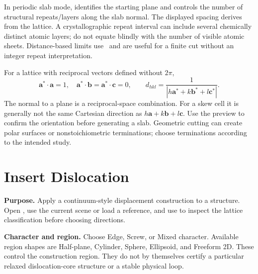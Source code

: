 In periodic slab mode,  identifies the starting plane and  controls the number of structural repeats/layers along the slab normal. The displayed spacing derives from the lattice. A crystallographic repeat interval can include several chemically distinct atomic layers; do not equate  blindly with the number of visible atomic sheets. Distance-based limits use \angstrom\ and are useful for a finite cut without an integer repeat interpretation.

For a lattice with reciprocal vectors defined without $2\pi$,
\[
\mathbf a^*\cdot\mathbf a=1,\quad
\mathbf a^*\cdot\mathbf b=\mathbf a^*\cdot\mathbf c=0,
\qquad d_{hkl}=\frac{1}{|h\mathbf a^*+k\mathbf b^*+l\mathbf c^*|}.
\]
The normal to a plane is a reciprocal-space combination. For a skew cell it is generally not the same Cartesian direction as $h\mathbf a+k\mathbf b+l\mathbf c$. Use the preview to confirm the orientation before generating a slab. Geometric cutting can create polar surfaces or nonstoichiometric terminations; choose terminations according to the intended study.

\section{Insert Dislocation}
\textbf{Purpose.} Apply a continuum-style displacement construction to a structure. Open , use the current scene or load a reference, and use  to inspect the lattice classification before choosing directions.

\textbf{Character and region.} Choose Edge, Screw, or Mixed character. Available region shapes are Half-plane, Cylinder, Sphere, Ellipsoid, and Freeform 2D. These control the construction region. They do not by themselves certify a particular relaxed dislocation-core structure or a stable physical loop.

